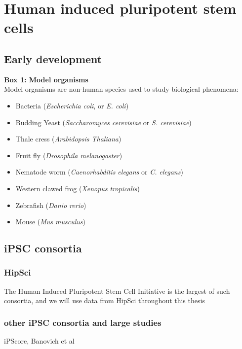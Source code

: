 \section{Human induced pluripotent stem cells}  %

\subsection{Early development}



\begin{Comment}
\hspace{-2.5mm}\textbf{Box 1: Model organisms}\label{box1}\\

Model organisms are non-human species used to study biological phenomena:

\begin{itemize}
    \item Bacteria (\textit{Escherichia coli}, or \textit{E. coli})
    \item Budding Yeast (\textit{Saccharomyces cerevisiae} or \textit{S. cerevisiae})
    \item Thale cress (\textit{Arabidopsis Thaliana})
    \item Fruit fly (\textit{Drosophila melanogaster})
    \item Nematode worm (\textit{Caenorhabditis elegans} or \textit{C. elegans})
    \item Western clawed frog (\textit{Xenopus tropicalis})
    \item Zebrafish (\textit{Danio rerio})
    \item Mouse (\textit{Mus musculus})

\end{itemize}


\end{Comment}


\subsection{iPSC consortia}

\subsubsection{HipSci}
The Human Induced Pluripotent Stem Cell Initiative is the largest of such consortia, and we will use data from HipSci throughout this thesis

\subsubsection{other iPSC consortia and large studies}

iPScore, Banovich et al

